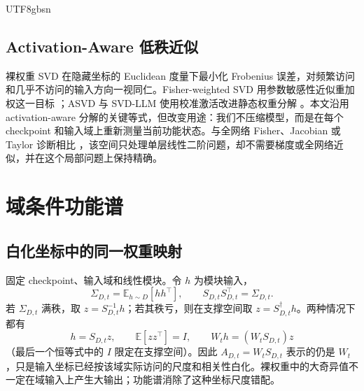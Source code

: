 \documentclass[letterpaper]{article} %
\begin{document}
\begin{CJK*}{UTF8}{gbsn}
\subsection{Activation-Aware 低秩近似}

裸权重 SVD 在隐藏坐标的 Euclidean 度量下最小化 Frobenius 误差，对频繁访问和几乎不访问的输入方向一视同仁。Fisher-weighted SVD 用参数敏感性近似重加权这一目标 \citep{hsu2022fisherweighted}；ASVD 与 SVD-LLM 使用校准激活改进静态权重分解 \citep{yuan2024asvd,wang2025svdllm}。本文沿用 activation-aware 分解的关键等式，但改变用途：我们不压缩模型，而是在每个 checkpoint 和输入域上重新测量当前功能状态。与全网络 Fisher、Jacobian 或 Taylor 诊断相比 \citep{amari1998natural,martens2015kfac,saadi2025flex}，该空间只处理单层线性二阶问题，却不需要梯度或全网络近似，并在这个局部问题上保持精确。

\section{域条件功能谱}

\subsection{白化坐标中的同一权重映射}

固定 checkpoint、输入域和线性模块。令 $h$ 为模块输入，
\begin{equation}
\Sigma_{D,t}=\mathbb E_{h\sim D}[hh^\top],
\qquad
S_{D,t}S_{D,t}^{\top}=\Sigma_{D,t}.
\label{eq:second-moment}
\end{equation}
若 $\Sigma_{D,t}$ 满秩，取 $z=S_{D,t}^{-1}h$；若其秩亏，则在支撑空间取 $z=S_{D,t}^{\dagger}h$。两种情况下都有
\begin{equation}
h=S_{D,t}z,\qquad \mathbb E[zz^\top]=I,\qquad
W_th=(W_tS_{D,t})z
\label{eq:whitened-map}
\end{equation}
（最后一个恒等式中的 $I$ 限定在支撑空间）。因此 $A_{D,t}=W_tS_{D,t}$ 表示的仍是 $W_t$，只是输入坐标已经按该域实际访问的尺度和相关性白化。裸权重中的大奇异值不一定在域输入上产生大输出；功能谱消除了这种坐标尺度错配。


\end{CJK*}
\end{document}
